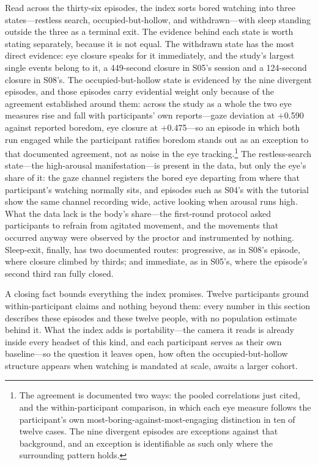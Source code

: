 Read across the thirty-six episodes, the index sorts bored watching into three
states---restless search, occupied-but-hollow, and withdrawn---with sleep standing outside
the three as a terminal exit. The evidence behind each state is worth stating separately,
because it is not equal. The withdrawn state has the most direct evidence: eye closure speaks
for it immediately, and the study's largest single events belong to it, a 449-second closure
in S05's session and a 124-second closure in S08's. The occupied-but-hollow state is
evidenced by the nine divergent episodes, and those episodes carry evidential weight only
because of the agreement established around them: across the study as a whole the two eye
measures rise and fall with participants' own reports---gaze deviation at $+$0.590 against
reported boredom, eye closure at $+$0.475---so an episode in which both run engaged while the
participant ratifies boredom stands out as an exception to that documented agreement, not as
noise in the eye tracking.\footnote{The agreement is documented two ways: the pooled
correlations just cited, and the within-participant comparison, in which each eye measure
follows the participant's own most-boring-against-most-engaging distinction in ten of twelve
cases. The nine divergent episodes are exceptions against that background, and an exception
is identifiable as such only where the surrounding pattern holds.} The restless-search state---the
high-arousal manifestation---is present in the data, but only the eye's share of it: the gaze
channel registers the bored eye departing from where that participant's watching normally
sits, and episodes such as S04's with the tutorial show the same channel recording wide,
active looking when arousal runs high. What the data lack is the body's share---the
first-round protocol asked participants to refrain from agitated movement, and the movements
that occurred anyway were observed by the proctor and instrumented by nothing. Sleep-exit,
finally, has two documented routes: progressive, as in S08's episode, where closure climbed
by thirds; and immediate, as in S05's, where the episode's second third ran fully closed.

A closing fact bounds everything the index promises. Twelve participants ground
within-participant claims and nothing beyond them: every number in this section describes
these episodes and these twelve people, with no population estimate behind it. What the index
adds is portability---the camera it reads is already inside every headset of this kind, and
each participant serves as their own baseline---so the question it leaves open, how often the
occupied-but-hollow structure appears when watching is mandated at scale, awaits a larger
cohort.
